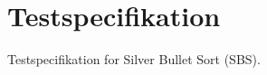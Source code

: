 \documentclass[Main.tex]{subfiles}
\begin{document}
\newpage
\section{Testspecifikation}
Testspecifikation for Silver Bullet Sort (SBS).
\end{document}
